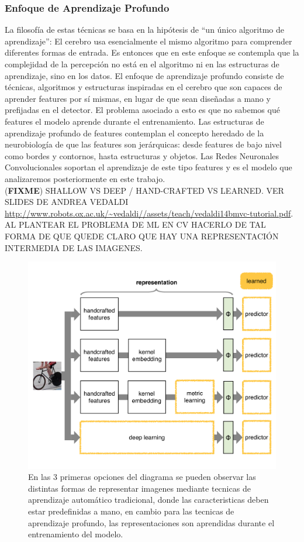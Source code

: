 \documentclass[a4paper,11pt,spanish]{book}
\newcommand*{\FIXME}[1]{{(\textbf{FIXME}) {#1}}}
\begin{document}
	\subsubsection{Enfoque de Aprendizaje Profundo}
	  La filosofía de estas técnicas se basa en la hipótesis de “un único algoritmo de aprendizaje”: El cerebro usa esencialmente el mismo algoritmo para comprender diferentes formas de entrada.
	  Es entonces que en este enfoque se contempla que la complejidad de la percepción no está en el algoritmo ni en las estructuras de aprendizaje, sino en los datos.
	  El enfoque de aprendizaje profundo consiste de técnicas, algoritmos y estructuras inspiradas en el cerebro que son capaces de aprender features por sí mismas,
	  en lugar de que sean diseñadas a mano y prefijadas en el detector. El problema asociado a esto es que no sabemos qué features el modelo aprende durante el entrenamiento.
	  Las estructuras de aprendizaje profundo de features contemplan el concepto heredado de la neurobiología de que las features son jerárquicas:
	  desde features de bajo nivel como bordes y contornos, hasta estructuras y objetos. Las Redes Neuronales Convolucionales soportan el aprendizaje de este tipo features
	  y es el modelo que analizaremos posteriormente en este trabajo.\\
	 \FIXME{SHALLOW VS DEEP / HAND-CRAFTED VS LEARNED. VER SLIDES DE ANDREA VEDALDI
            \url{http://www.robots.ox.ac.uk/~vedaldi//assets/teach/vedaldi14bmvc-tutorial.pdf}.
            AL PLANTEAR EL PROBLEMA DE ML EN CV HACERLO DE TAL FORMA DE QUE QUEDE CLARO QUE HAY UNA REPRESENTACIÓN INTERMEDIA DE LAS IMAGENES.}
	  \begin{figure}[h!]
            \begin{center}
              	    \includegraphics[width=0.9\linewidth]{./img/vedaldi_shallow_deep.pdf}
	    \caption{En las 3 primeras opciones del diagrama se pueden observar las distintas formas de representar imagenes mediante tecnicas de aprendizaje automático tradicional,
	    donde las caracteristicas deben estar predefinidas a mano, en cambio para las tecnicas de aprendizaje profundo, las representaciones son aprendidas durante el entrenamiento
	    del modelo.}
	    \label{fig:shallow_deep}
            \end{center}
	  \end{figure}
\end{document}
